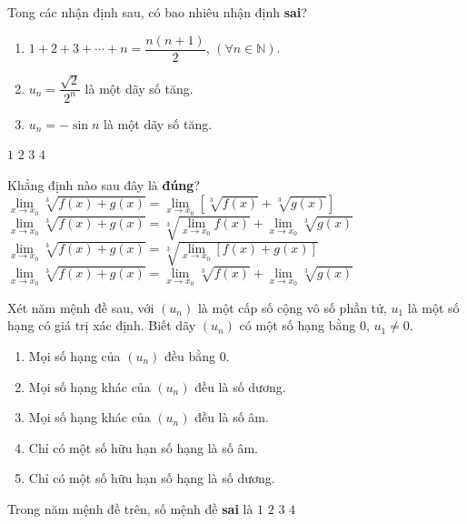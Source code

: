 \begin{ex}%
	Tong các nhận định sau, có bao nhiêu nhận định \textbf{sai}?
	\begin{enumerate}[(1)]
		\item $1+2+3+\cdots+n=\dfrac{n(n+1)}{2}$, $(\forall n\in\mathbb{N})$.
		\item $u_n=\dfrac{\sqrt{2}}{2^n}$ là một dãy số tăng.
		\item $u_n=-\sin n$ là một dãy số tăng.
	\end{enumerate}
	\choice
	{$1$}
	{\True $2$}
	{$3$}
	{$4$}
\end{ex}

\begin{ex}%
	Khẳng định nào sau đây là \textbf{đúng}?
	\choice
	{$\lim\limits_{x\to x_0}\sqrt[3]{f(x)+g(x)}=\lim\limits_{x\to x_0}\left[\sqrt[3]{f(x)}+\sqrt[3]{g(x)}\right]$}
	{$\lim\limits_{x\to x_0}\sqrt[3]{f(x)+g(x)}=\sqrt[3]{\lim\limits_{x\to x_0}f(x)}+\lim\limits_{x\to x_0}\sqrt[3]{g(x)}$}
	{\True $\lim\limits_{x\to x_0}\sqrt[3]{f(x)+g(x)}=\sqrt[3]{\lim\limits_{x\to x_0}\left[f(x)+g(x)\right]}$}
	{$\lim\limits_{x\to x_0}\sqrt[3]{f(x)+g(x)}=\lim\limits_{x\to x_0}\sqrt[3]{f(x)}+\lim\limits_{x\to x_0}\sqrt[3]{g(x)}$}
\end{ex}

\begin{ex}%
	Xét năm mệnh đề sau, với $(u_n)$ là một cấp số cộng vô số phần tử, $u_1$ là một số hạng có giá trị xác định. Biết dãy $(u_n)$ có một số hạng bằng $0$, $u_1\ne 0$.
	\begin{enumerate}[(1)]
		\item Mọi số hạng của $(u_n)$ đều bằng $0$.
		\item Mọi số hạng khác của $(u_n)$ đều là số dương.
		\item Mọi số hạng khác của $(u_n)$ đều là số âm.
		\item Chỉ có một số hữu hạn số hạng là số âm.
		\item Chỉ có một số hữu hạn số hạng là số dương.
	\end{enumerate}
	Trong năm mệnh đề trên, số mệnh đề \textbf{sai} là
	\choice
	{$1$}
	{$2$}
	{$3$}
	{\True $4$}
\end{ex}

